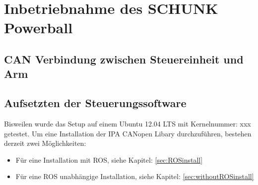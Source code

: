 \chapter{Inbetriebnahme des SCHUNK Powerball}
\label{sec:Inbetriebnahme}

\section{CAN Verbindung zwischen Steuereinheit und Arm}
\section{Aufsetzten der Steuerungssoftware}
Bisweilen wurde das Setup auf einem Ubuntu 12.04 LTS mit Kernelnummer: xxx getestet.
Um eine Installation der IPA CANopen Libary durchzuführen, bestehen derzeit zwei Möglichkeiten:
\begin{itemize}
   \item Für eine Installation mit ROS, siehe Kapitel: \ref{sec:ROSinstall}
   \item Für eine ROS unabhängige Installation, siehe Kapitel: \ref{sec:withoutROSinstall}

\end{itemize}


\section{}
\section{}
\section{}
\section{}